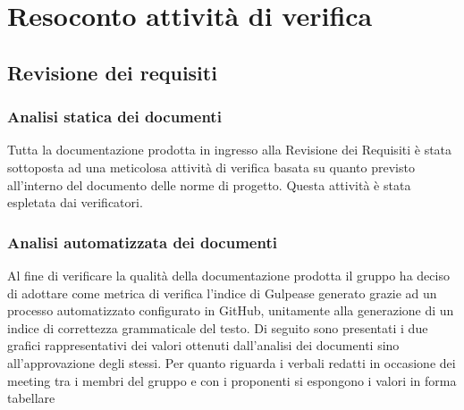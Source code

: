 \section{Resoconto attività di verifica}
\subsection{Revisione dei requisiti}
\subsubsection{Analisi statica dei documenti}
Tutta la documentazione prodotta in ingresso alla Revisione dei Requisiti è stata sottoposta ad una meticolosa attività di verifica
basata su quanto previsto all'interno del documento delle norme di progetto.
Questa attività è stata espletata dai verificatori.

\subsubsection{Analisi automatizzata dei documenti}
Al fine di verificare la qualità della documentazione prodotta il gruppo ha deciso di adottare come metrica di verifica
l'indice di Gulpease generato grazie ad un processo automatizzato configurato in GitHub, unitamente alla generazione di un indice di 
correttezza grammaticale del testo.
Di seguito sono presentati i due grafici rappresentativi dei valori ottenuti dall'analisi dei documenti sino all'approvazione degli stessi.
Per quanto riguarda i verbali redatti in occasione dei meeting tra i membri del gruppo e con i proponenti si espongono i valori in forma tabellare


